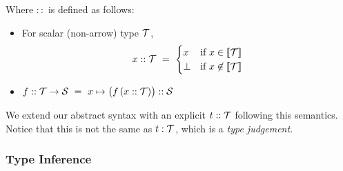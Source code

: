 Where $::$ is defined as follows:
\begin{itemize}
  \item For scalar (non-arrow) type $\mathcal{T}$, \[x :: \mathcal{T} ~=~ \begin{cases}x & \mbox{if }x\in[\![{\mathcal{T}}]\!] \\ \bot & \mbox{if }x\not\in[\![{\mathcal{T}}]\!]\end{cases}\]
  \item $f :: \mathcal{T}\to\mathcal{S} ~=~ x\mapsto \big(f\,(x :: \mathcal{T})\big) :: \mathcal{S}$
\end{itemize}

\medskip
We extend our abstract syntax with an explicit 
$t::\mathcal{T}$ following this semantics. Notice that this is not the same as $t:\mathcal{T}$, which is a \emph{type judgement}.

\subsubsection*{Type Inference}

